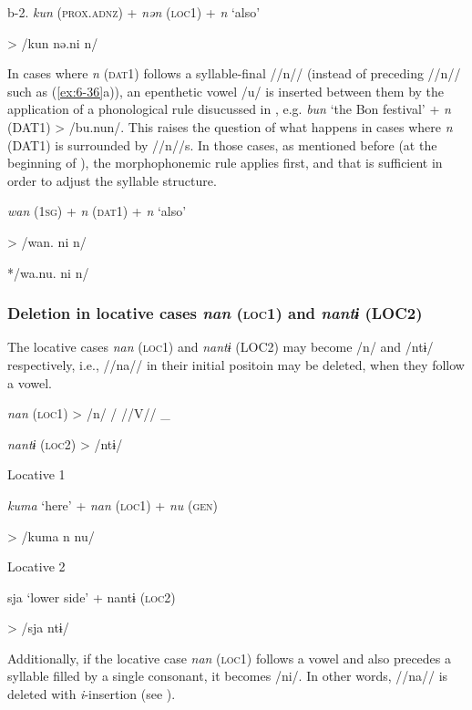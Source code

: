 \begin{table}
  b-2.  \textit{kun}  (\textsc{prox}.\textsc{adnz})  +  \textit{nən}  (\textsc{loc}1)  +  \textit{n}  ‘also’

  >  /kun      nə.ni      n/  

In cases where \textit{n} (\textsc{dat}1) follows a syllable-final //n// (instead of preceding //n// such as (\ref{ex:6-36}a)), an epenthetic vowel /u/ is inserted between them by the application of a phonological rule disucussed in , e.g. \textit{bun} ‘the Bon festival’ + \textit{n} (DAT1) > /bu.nun/. This raises the question of what happens in cases where \textit{n} (DAT1) is surrounded by //n//s. In those cases, as mentioned before (at the beginning of ), the morphophonemic rule  applies first, and that is sufficient in order to adjust the syllable structure.

\ea\label{ex:6-37}
    \textit{wan}  (1\textsc{sg})  +  \textit{n}  (\textsc{dat}1)  +  \textit{n}  ‘also’

  >  /wan.      ni      n/  

    */wa.nu.      ni      n/  

\subsubsection{Deletion in locative cases \textit{nan} (\textsc{loc}1) and \textit{nantɨ} (LOC2)}

The locative cases \textit{nan} (\textsc{loc}1) and \textit{nantɨ} (LOC2) may become /n/ and /ntɨ/ respectively, i.e., //na// in their initial positoin may be deleted, when they follow a vowel.

\ea\label{ex:6-38}
  \textit{nan}  (\textsc{loc}1)  >  %
/n/    /  //V//  \_

  \textit{nantɨ}  (\textsc{loc}2)  >  /ntɨ/

\ea\label{ex:6-39}
 \ea Locative 1      \\
\gll

    \textit{kuma}  ‘here’  +  \textit{nan}  (\textsc{loc}1)  +  \textit{nu}  (\textsc{gen})

  >  /kuma      n      nu/  

\ex Locative 2      \\
\gll

    sja  ‘lower side’  +  nantɨ  (\textsc{loc}2)

  >  /sja      ntɨ/        

Additionally, if the locative case \textit{nan} (\textsc{loc}1) follows a vowel and also precedes a syllable filled by a single consonant, it becomes /ni/. In other words, //na// is deleted with \textit{i}-insertion (see ).


\end{table}
